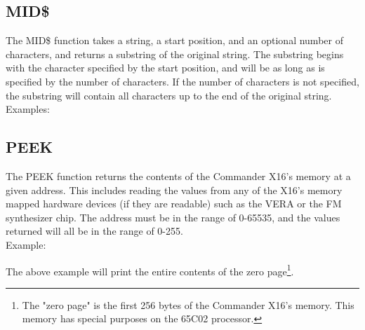 \subsection{MID\$}

The {\ttfamily MID\$} function takes a string, a start position, and an
optional number of characters, and returns a substring of the original string.
The substring begins with the character specified by the start position, and
will be as long as is specified by the number of characters.  If the number of
characters is not specified, the substring will contain all characters up to
the end of the original string.\\

Examples:\\


\subsection{PEEK}

The {\ttfamily PEEK} function returns the contents of the Commander X16's
memory at a given address.  This includes reading the values from any of the
X16's memory mapped hardware devices (if they are readable) such as the VERA or
the FM synthesizer chip.  The address must be in the range of 0-65535, and the
values returned will all be in the range of 0-255.\\

Example:\\


The above example will print the entire contents of the zero page\footnote{The
"zero page" is the first 256 bytes of the Commander X16's memory.  This memory
has special purposes on the 65C02 processor.}.\\

